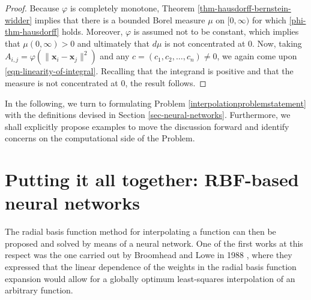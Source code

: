 \documentclass[12pt]{report} %
\newcommand{\tmmathbf}[1]{\ensuremath{\boldsymbol{#1}}}
\begin{document}
\begin{proof}
  Because $\varphi$ is completely monotone, Theorem
  \ref{thm-hausdorff-bernstein-widder} implies that there is a bounded Borel
  measure $\mu$ on $[0, \infty)$ for which \eqref{phi-thm-hausdorff} holds.
  Moreover, $\varphi$ is assumed not to be constant, which implies that $\mu (0,
    \infty) > 0$ and ultimately that $d \mu$ is not concentrated at $0$. Now,
  taking $A_{i, j} = \varphi (\| \tmmathbf{x}_i -\tmmathbf{x}_j \|^2)$ and any
  $c = (c_1, c_2, \ldots, c_n) \neq 0$, we again come upon
  \eqref{eqn-linearity-of-integral}. Recalling that the integrand is positive
  and that the measure is not concentrated at $0$, the result follows.
\end{proof}

In the following, we turn to formulating Problem \ref{interpolationproblemstatement}
with the definitions devised in Section \ref{sec-neural-networks}. Furthermore,
we shall explicitly propose examples to move the discussion forward and identify
concerns on the computational side of the Problem.

\section{Putting it all together: RBF-based neural networks}

The radial basis function method for interpolating a function can then be
proposed and solved by means of a neural network. One of the first works at
this respect was the one carried out by Broomhead and Lowe in 1988
  {\cite{broomhead1988multivariable}}, where they expressed that the linear
dependence of the weights in the radial basis function expansion would allow
for a globally optimum least-squares interpolation of an arbitrary function.
\end{document}
